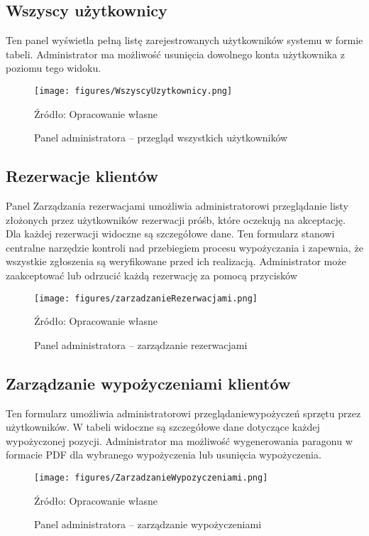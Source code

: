 \subsection{Wszyscy użytkownicy}
Ten panel wyświetla pełną listę zarejestrowanych użytkowników systemu w formie tabeli. 
Administrator ma możliwość usunięcia dowolnego konta użytkownika z poziomu tego widoku.
\vspace{-0.3cm}
\begin{figure}[!htbp]
    \centering
    \texttt{[image: figures/WszyscyUzytkownicy.png]}
    \caption{Panel administratora – przegląd wszystkich użytkowników}
    \label{fig:wszyscyUzytkownicy}
    \vspace{-0.2cm}
    \small{Źródło: Opracowanie własne}
\end{figure}


\subsection{Rezerwacje klientów}
Panel Zarządzania rezerwacjami umożliwia administratorowi przeglądanie listy złożonych przez użytkowników rezerwacji próśb, które oczekują na akceptację. Dla każdej rezerwacji widoczne są szczegółowe dane. Ten formularz stanowi centralne narzędzie kontroli nad przebiegiem procesu wypożyczania i zapewnia, że wszystkie zgłoszenia są weryfikowane przed ich realizacją. Administrator może zaakceptować lub odrzucić każdą rezerwację za pomocą przycisków
\vspace{-0.2cm}
\begin{figure}[!htbp]
    \centering
    \texttt{[image: figures/zarzadzanieRezerwacjami.png]}
    \caption{Panel administratora – zarządzanie rezerwacjami}
    \label{fig:zarzadzanieRezerwacjami}
    \small{Źródło: Opracowanie własne}
\end{figure}

\subsection{Zarządzanie wypożyczeniami klientów}
Ten formularz umożliwia administratorowi przeglądaniewypożyczeń sprzętu przez użytkowników. W tabeli widoczne są szczegółowe dane dotyczące każdej wypożyczonej pozycji. Administrator ma możliwość wygenerowania paragonu w formacie PDF dla wybranego wypożyczenia lub usunięcia wypożyczenia.
\vspace{-0.5cm}
\begin{figure}[H]
    \centering
    \texttt{[image: figures/ZarzadzanieWypozyczeniami.png]}
    \captionsetup{font=footnotesize, skip=2pt}
    \caption{Panel administratora – zarządzanie wypożyczeniami}
    \label{fig:zarzadzanieWypozyczeniami}
    \small{Źródło: Opracowanie własne}
\end{figure}